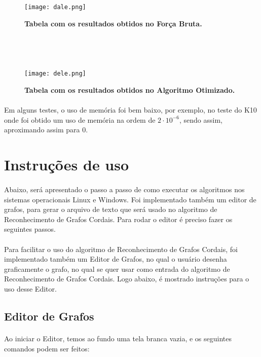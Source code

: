 \documentclass[a4paper, 11pt]{article}
\begin{document}
				\begin{figure}[H]
					\centering
					\texttt{[image: dale.png]}
					\caption{\textbf{Tabela com os resultados obtidos no Força Bruta.}}
					
					\ 
					
					\
					
					\texttt{[image: dele.png]}
					\centering
					\caption{\textbf{Tabela com os resultados obtidos no Algoritmo Otimizado.}}
				\end{figure}
			
			\paragraph{} Em alguns testes, o uso de memória  foi bem baixo, por exemplo, no teste do K10 onde foi obtido um uso de memória na ordem de $2 \cdot 10^{-6}$, sendo assim, aproximando assim para 0.
				
				
		\section{Instruções de uso}
			\paragraph{}Abaixo, será apresentado o passo a passo de como executar os algoritmos nos sistemas operacionais Linux e Windows. Foi implementado também um editor de grafos, para gerar o arquivo de texto que será usado no algoritmo de Reconhecimento de Grafos Cordais. Para rodar o editor é preciso fazer os seguintes passos.
			
			\paragraph{}Para facilitar o uso do algoritmo de Reconhecimento de Grafos Cordais, foi implementado também um Editor de Grafos, no qual o usuário desenha graficamente o grafo, no qual se quer usar como entrada do algoritmo de Reconhecimento de Grafos Cordais. Logo abaixo, é mostrado instruções para o uso desse Editor.
			
			\subsection{Editor de Grafos}
				\paragraph{} Ao iniciar o Editor, temos ao fundo uma tela branca vazia, e os seguintes comandos podem ser feitos:
				
\end{document}
